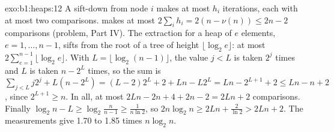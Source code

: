 \begin{solution}{exo:b1:heaps:12}
A sift-down from node $i$ makes at most $h_i$ iterations, each with at most two comparisons.  makes at most
$2\sum_i h_i = 2(n - \nu(n)) \leq 2n - 2$ comparisons (problem, Part IV). The extraction for a heap of $e$ elements, $e
= 1, \dots, n - 1$, sifts from the root of a tree of height $\lfloor \log_2 e \rfloor$: at most $2 \sum_{e=1}^{n-1}
\lfloor \log_2 e \rfloor$. With $L = \lfloor \log_2 (n - 1) \rfloor$, the value $j < L$ is taken $2^j$ times and $L$ is
taken $n - 2^L$ times, so the sum is $\sum_{j < L} j 2^j + L(n - 2^L) = (L - 2)2^L + 2 + Ln - L2^L = Ln - 2^{L+1} + 2 \leq
Ln - n + 2$, since $2^{L+1} \geq n$. In all, at most $2Ln - 2n + 4 + 2n - 2 = 2Ln + 2$ comparisons. Finally $\log_2 n - L
\geq \log_2 \frac{n}{n - 1} \geq \frac{1}{n \ln 2}$, so $2n \log_2 n \geq 2Ln + \frac{2}{\ln 2} > 2Ln + 2$. The
measurements give 1.70 to 1.85 times $n \log_2 n$.
\end{solution}

